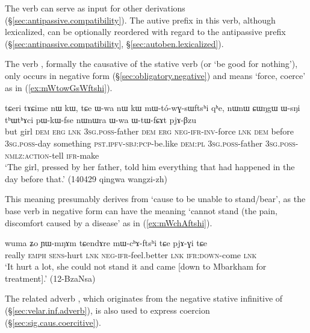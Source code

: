 The verb  can serve as input for other derivations (§\ref{sec:antipassive.compatibility}). The autive prefix  in this verb, although lexicalized, can be optionally reordered with regard to the antipassive prefix (§\ref{sec:antipassive.compatibility}, §\ref{sec:autoben.lexicalized}).

The verb , formally the causative of the stative verb  (or `be good for nothing'), only occurs in negative form (§\ref{sec:obligatory.negative}) and means `force, coerce' as in (\ref{ex:mWtowGsWftshi}).

\begin{exe}
\ex \label{ex:mWtowGsWftshi}
 \gll   tɕeri tɤɕime nɯ kɯ, tɕe ɯ-wa nɯ kɯ mɯ-tó-wɣ-sɯftsʰi qʰe, nɯnɯ ɕɯŋgɯ ɯ-sŋi tʰɯtʰɤci pɯ-kɯ-fse nɯnɯra ɯ-wa ɯ-tɯ-fɕɤt pjɤ-βzu \\
 but girl \textsc{dem} \textsc{erg} \textsc{lnk} \textsc{3sg}.\textsc{poss}-father \textsc{dem} \textsc{erg} \textsc{neg}-\textsc{ifr}-\textsc{inv}-force \textsc{lnk} \textsc{dem} before \textsc{3sg}.\textsc{poss}-day something \textsc{pst}.\textsc{ipfv}-\textsc{sbj}:\textsc{pcp}-be.like \textsc{dem}:\textsc{pl} \textsc{3sg}.\textsc{poss}-father \textsc{3sg}.\textsc{poss}-\textsc{nmlz}:\textsc{action}-tell \textsc{ifr}-make \\
\glt `The girl, pressed by her father, told him everything that had happened in the day before that.' (140429 qingwa wangzi-zh)
\end{exe}

This meaning presumably derives from `cause to be unable to stand/bear', as the base verb  in negative form can have the meaning `cannot stand (the pain, discomfort caused by a disease' as in (\ref{ex:mWchAftshi}).

\begin{exe}
\ex \label{ex:mWchAftshi}
 \gll wuma ʑo ɲɯ-mŋɤm tɕendɤre mɯ-cʰɤ-ftsʰi tɕe pjɤ-ɣi tɕe \\
 really \textsc{emph} \textsc{sens}-hurt \textsc{lnk} \textsc{neg}-\textsc{ifr}-feel.better \textsc{lnk} \textsc{ifr}:\textsc{down}-come \textsc{lnk} \\
\glt `It hurt a lot, she could not stand it and came [down to Mbarkham for treatment].' (12-BzaNsa)
\end{exe}

The related adverb , which originates from the negative stative infinitive of  (§\ref{sec:velar.inf.adverb}), is also used to express coercion (§\ref{sec:sig.caus.coercitive}).

